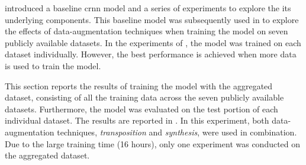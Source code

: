 
 introduced a baseline \gls{crnn}
model and a series of experiments to explore the its
underlying components. This baseline model was subsequently
used in  to explore the
effects of data-augmentation techniques when training the
model on seven publicly available datasets. In the
experiments of , the model
was trained on each dataset individually. However, the best
performance is achieved when more data is used to train the
model.

This section reports the results of training the model with
the aggregated dataset, consisting of all the training data
across the seven publicly available datasets. Furthermore,
the model was evaluated on the test portion of each
individual dataset. The results are reported in
. In this experiment, both
data-augmentation techniques, \emph{transposition} and
\emph{synthesis}, were used in combination. Due to the large
training time (16 hours), only one experiment was conducted
on the aggregated dataset.

